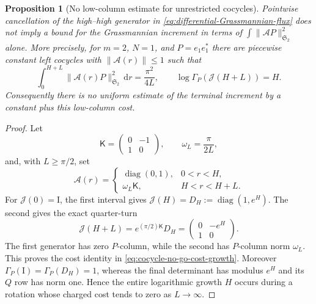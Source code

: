 \documentclass[11pt]{article}
\newcommand{\HS}{\mathfrak S_2}
\newcommand{\Id}{\mathrm I}
\newcommand{\dd}{\,\mathrm d}
\DeclareMathOperator{\diag}{diag}
\newtheorem{proposition}[theorem]{Proposition}
\theoremstyle{definition}
\theoremstyle{remark}
\begin{document}
\begin{proposition}[No low-column estimate for unrestricted cocycles]
\label{prop:cocycle-low-column-no-go}
Pointwise cancellation of the high--high generator in
\eqref{eq:differential-Grassmannian-flux} does not imply a bound for the
Grassmannian increment in terms of $\int\|\mathcal AP\|_{\HS}^2$ alone.  More
precisely, for $m=2$, $N=1$, and $P=e_1e_1^*$ there are piecewise constant
left cocycles with $\|\mathcal A(r)\|\leq1$ such that
\begin{equation}
 \int_0^{H+L}\|\mathcal A(r)P\|_{\HS}^2\dd r
 =\frac{\pi^2}{4L},
 \qquad
 \log\Gamma_P(\mathcal J(H+L))=H.
 \label{eq:cocycle-no-go-cost-growth}
\end{equation}
Consequently there is no uniform estimate of the terminal increment by a
constant plus this low-column cost.
\end{proposition}

\begin{proof}
Let
\begin{equation}
 \mathsf K=\begin{pmatrix}0&-1\\1&0\end{pmatrix},
 \qquad
 \omega_L=\frac{\pi}{2L},
\end{equation}
and, with $L\geq\pi/2$, set
\begin{equation}
 \mathcal A(r)=
 \begin{cases}
  \diag(0,1),&0<r<H,\\
  \omega_L\mathsf K,&H<r<H+L.
 \end{cases}
 \label{eq:cocycle-no-go-generator}
\end{equation}
For $\mathcal J(0)=\Id$, the first interval gives
$\mathcal J(H)=D_H:=\diag(1,e^H)$.  The second gives the exact quarter-turn
\begin{equation}
 \mathcal J(H+L)=e^{(\pi/2)\mathsf K}D_H
 =\begin{pmatrix}0&-e^H\\1&0\end{pmatrix}.
\end{equation}
The first generator has zero $P$-column, while the second has $P$-column norm
$\omega_L$.  This proves the cost identity in
\eqref{eq:cocycle-no-go-cost-growth}.  Moreover
$\Gamma_P(\Id)=\Gamma_P(D_H)=1$, whereas the final determinant has modulus
$e^H$ and its $Q$ row has norm one.  Hence the entire logarithmic growth $H$
occurs during a rotation whose charged cost tends to zero as $L\to\infty$.
\end{proof}
\end{document}
